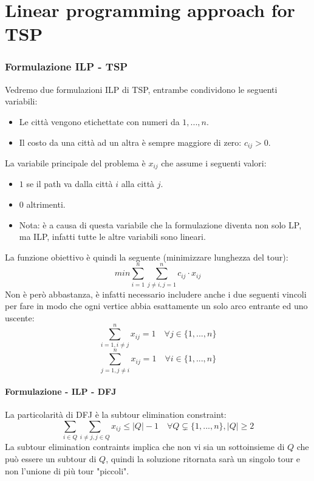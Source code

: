 \documentclass[12pt,a4paper]{article}
\begin{document}
\pagebreak
\part{Linear programming approach for TSP}

\section{Formulazione ILP - TSP}
Vedremo due formulazioni ILP di TSP, entrambe condividono le seguenti variabili:
\begin{itemize}
\item Le città vengono etichettate con numeri da $1,...,n$.
\item Il costo da una città ad un altra è sempre maggiore di zero: $c_{ij} > 0$.
\end{itemize}
La variabile principale del problema è $x_{ij}$ che assume i seguenti valori:
\begin{itemize}
\item $1$ se il path va dalla città $i$ alla città $j$.
\item $0$ altrimenti.
\item Nota: è a causa di questa variabile che la formulazione diventa non solo LP, ma ILP, infatti tutte le altre variabili sono lineari.
\end{itemize}
La funzione obiettivo è quindi la seguente (minimizzare lunghezza del tour):$$ min \displaystyle\sum_{i = 1}^{n} \sum_{j \neq i, j = 1}^{n} {c_{i j} \cdot x_{i j}}$$
Non è però abbastanza, è infatti necessario includere anche i due seguenti vincoli per fare in modo che ogni vertice abbia esattamente un solo arco entrante ed uno uscente:
$$ \displaystyle\sum_{i = 1, i \neq j}^{n} {x_{i j} = 1 \quad \forall j \in \lbrace 1,...,n \rbrace }$$
$$ \displaystyle\sum_{j = 1, j \neq i}^{n} {x_{i j} = 1 \quad \forall i \in \lbrace 1,...,n \rbrace }$$

\subsection{Formulazione - ILP - DFJ}
La particolarità di DFJ è la subtour elimination constraint: $$\displaystyle\sum_{i \in Q} \sum_{i \neq j, j \in Q} {x_{ij} \leq \vert Q \vert - 1} \quad \forall Q \subsetneq \lbrace 1,...,n \rbrace , \vert Q \vert \geq 2$$
La subtour elimination contraints implica che non vi sia un sottoinsieme di $Q$ che può essere un subtour di $Q$, quindi la soluzione ritornata sarà un singolo tour e non l'unione di più tour "piccoli".
\end{document}
